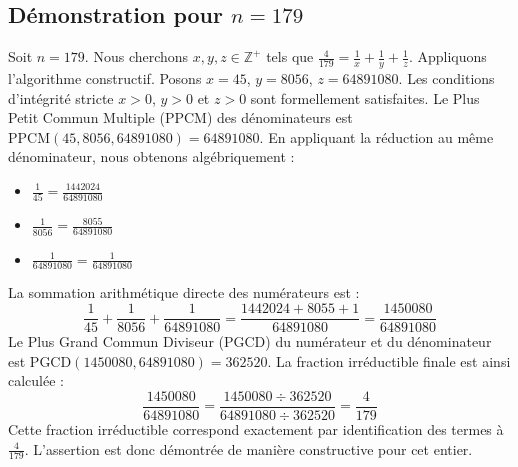 \documentclass[11pt,a4paper]{article}
\begin{document}
\subsection{Démonstration pour $n = 179$}
Soit $n = 179$. Nous cherchons $x, y, z \in \mathbb{Z}^{+}$ tels que $\frac{4}{179} = \frac{1}{x} + \frac{1}{y} + \frac{1}{z}$.
Appliquons l'algorithme constructif. Posons $x = 45$, $y = 8056$, $z = 64891080$.
Les conditions d'intégrité stricte $x > 0$, $y > 0$ et $z > 0$ sont formellement satisfaites.
Le Plus Petit Commun Multiple (PPCM) des dénominateurs est $\text{PPCM}(45, 8056, 64891080) = 64891080$.
En appliquant la réduction au même dénominateur, nous obtenons algébriquement :
\begin{itemize}
    \item $\frac{1}{45} = \frac{1442024}{64891080}$
    \item $\frac{1}{8056} = \frac{8055}{64891080}$
    \item $\frac{1}{64891080} = \frac{1}{64891080}$
\end{itemize}
La sommation arithmétique directe des numérateurs est :
$$ \frac{1}{45} + \frac{1}{8056} + \frac{1}{64891080} = \frac{1442024 + 8055 + 1}{64891080} = \frac{1450080}{64891080} $$
Le Plus Grand Commun Diviseur (PGCD) du numérateur et du dénominateur est $\text{PGCD}(1450080, 64891080) = 362520$.
La fraction irréductible finale est ainsi calculée :
$$ \frac{1450080}{64891080} = \frac{1450080 \div 362520}{64891080 \div 362520} = \frac{4}{179} $$
Cette fraction irréductible correspond exactement par identification des termes à $\frac{4}{179}$. L'assertion est donc démontrée de manière constructive pour cet entier.
\end{document}
